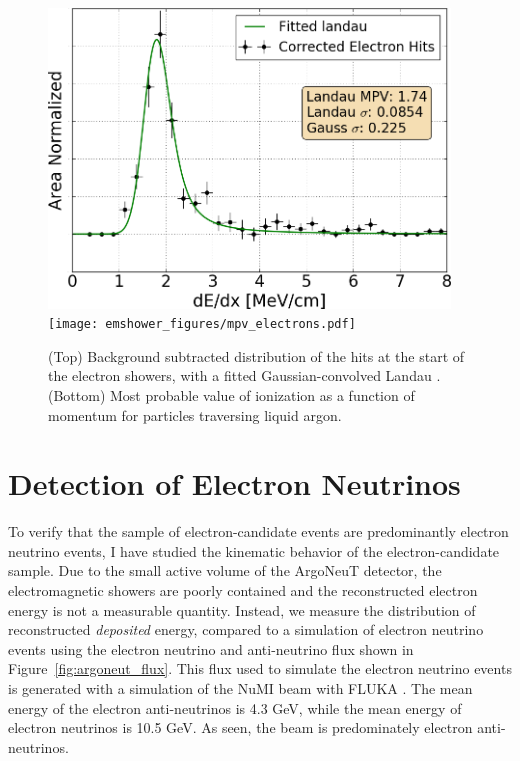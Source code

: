 \begin{figure}[htb]
  \centering
  \includegraphics[width=0.95\textwidth]{emshower_figures/fitted_electron_landau_trimmed.png}
  \texttt{[image: emshower\_figures/mpv\_electrons.pdf]}
  \caption{(Top) Background subtracted distribution of the hits at the start of the electron showers, with a fitted Gaussian-convolved Landau .  (Bottom) Most probable value of ionization as a function of momentum for particles traversing liquid argon.}
  \label{fig:mpv_electrons}
 \end{figure} 

\FloatBarrier

\section{\label{sec:electrons} Detection of Electron Neutrinos}

To verify that the sample of electron-candidate events are predominantly electron neutrino events, I have studied the kinematic behavior of the electron-candidate sample.  Due to the small active volume of the ArgoNeuT detector, the electromagnetic showers are poorly contained and the reconstructed electron energy is not a measurable quantity.  Instead, we measure the distribution of reconstructed {\em deposited} energy, compared to a simulation of electron neutrino events using the electron neutrino and anti-neutrino flux shown in Figure~\ref{fig:argoneut_flux}.  This flux used to simulate the electron neutrino events is generated with a simulation of the NuMI beam with FLUKA \cite{Aliaga:2016oaz}.  The mean energy of the electron anti-neutrinos is 4.3 GeV, while the mean energy of electron neutrinos is 10.5 GeV.  As seen, the beam is predominately electron anti-neutrinos.

